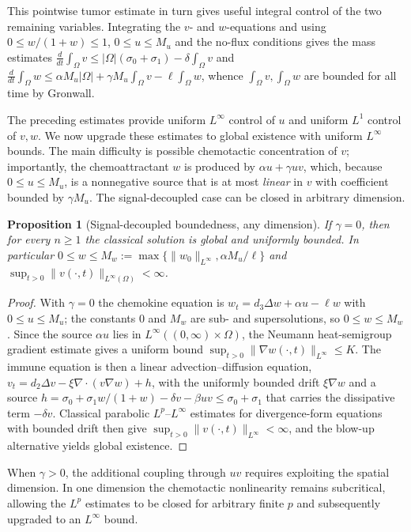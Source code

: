 \documentclass[]{interact}
\theoremstyle{plain}%
\newtheorem{proposition}[theorem]{Proposition}
\theoremstyle{definition}
\theoremstyle{remark}
\newcommand{\Om}{\Omega}
\begin{document}
This pointwise tumor estimate in turn gives useful integral control of the two
remaining variables. Integrating the $v$- and $w$-equations and using
$0\le w/(1+w)\le1$, $0\le u\le M_u$ and the no-flux conditions gives the mass
estimates
$\frac{d}{dt}\!\int_\Om v\le|\Om|(\sigma_0+\sigma_1)-\delta\!\int_\Om v$ and
$\frac{d}{dt}\!\int_\Om w\le\alpha M_u|\Om|+\gamma M_u\!\int_\Om v-\ell\!\int_\Om w$,
whence $\int_\Om v,\int_\Om w$ are bounded for all time by Gronwall.

The preceding estimates provide uniform $L^\infty$ control of $u$ and uniform
$L^1$ control of $v,w$. We now upgrade these estimates to global existence with
uniform $L^\infty$ bounds. The main difficulty is possible chemotactic
concentration of $v$; importantly, the chemoattractant $w$ is produced by
$\alpha u+\gamma uv$, which, because $0\le u\le M_u$, is a nonnegative source
that is at most \emph{linear} in $v$ with coefficient bounded by $\gamma M_u$.
The signal-decoupled case can be closed in arbitrary dimension.

\begin{proposition}[Signal-decoupled boundedness, any dimension]
\label{app:prop:gamma0}
If $\gamma=0$, then for every $n\ge1$ the classical solution is global and
uniformly bounded. In particular $0\le w\le M_w:=\max\{\|w_0\|_{L^\infty},
\alpha M_u/\ell\}$ and $\sup_{t>0}\|v(\cdot,t)\|_{L^\infty(\Om)}<\infty$.
\end{proposition}

\begin{proof}
With $\gamma=0$ the chemokine equation is $w_t=d_3\Delta w+\alpha u-\ell w$ with
$0\le u\le M_u$; the constants $0$ and $M_w$ are sub- and supersolutions, so
$0\le w\le M_w$. Since the source $\alpha u$ lies in
$L^\infty((0,\infty)\times\Om)$, the Neumann heat-semigroup gradient estimate
gives a uniform bound $\sup_{t>0}\|\nabla w(\cdot,t)\|_{L^\infty}\le K$. The
immune equation is then a linear advection--diffusion equation,
$v_t=d_2\Delta v-\xi\nabla\!\cdot(v\nabla w)+h$, with the uniformly bounded drift
$\xi\nabla w$ and a source $h=\sigma_0+\sigma_1w/(1+w)-\delta v-\beta uv\le
\sigma_0+\sigma_1$ that carries the dissipative term $-\delta v$. Classical
parabolic $L^p$--$L^\infty$ estimates for divergence-form equations with bounded
drift then give $\sup_{t>0}\|v(\cdot,t)\|_{L^\infty}<\infty$, and the blow-up
alternative yields global existence.
\end{proof}

When $\gamma>0$, the additional coupling through $uv$ requires exploiting the
spatial dimension. In one dimension the chemotactic nonlinearity remains
subcritical, allowing the $L^p$ estimates to be closed for arbitrary finite
$p$ and subsequently upgraded to an $L^\infty$ bound.
\end{document}
